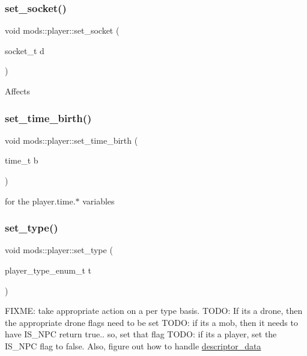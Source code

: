 \subsubsection{\texorpdfstring{set\+\_\+socket()}{set\_socket()}}
{\footnotesize\ttfamily void mods\+::player\+::set\+\_\+socket (\begin{DoxyParamCaption}\item[{socket\+\_\+t}]{d }\end{DoxyParamCaption})}

Affects \mbox{\label{classmods_1_1player_ac40139396e5026382a297640fa5d57d2}} 
\subsubsection{\texorpdfstring{set\+\_\+time\+\_\+birth()}{set\_time\_birth()}}
{\footnotesize\ttfamily void mods\+::player\+::set\+\_\+time\+\_\+birth (\begin{DoxyParamCaption}\item[{time\+\_\+t}]{b }\end{DoxyParamCaption})}

for the player.\+time.$\ast$ variables \mbox{\label{classmods_1_1player_a75e7ab6e28ec637e3d1a8f905162bf3e}} 
\subsubsection{\texorpdfstring{set\+\_\+type()}{set\_type()}}
{\footnotesize\ttfamily void mods\+::player\+::set\+\_\+type (\begin{DoxyParamCaption}\item[{player\+\_\+type\+\_\+enum\+\_\+t}]{t }\end{DoxyParamCaption})}

F\+I\+X\+ME\+: take appropriate action on a per type basis. T\+O\+DO\+: If it\textquotesingle{}s a drone, then the appropriate drone flags need to be set T\+O\+DO\+: if it\textquotesingle{}s a mob, then it needs to have I\+S\+\_\+\+N\+PC return true.. so, set that flag T\+O\+DO\+: if it\textquotesingle{}s a player, set the I\+S\+\_\+\+N\+PC flag to false. Also, figure out how to handle \hyperlink{structmods_1_1descriptor__data}{descriptor\+\_\+data}\mbox{\label{classmods_1_1player_a3d00ca11aeb86fa14ed502a661b84d9a}} 
